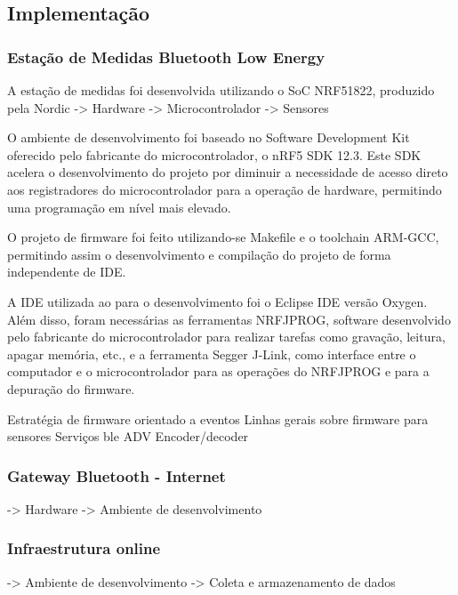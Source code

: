 \subsection{Implementação}

\subsubsection{Estação de Medidas Bluetooth Low Energy}

A estação de medidas foi desenvolvida utilizando o SoC NRF51822, produzido pela Nordic
-> Hardware
-> Microcontrolador
-> Sensores		

O ambiente de desenvolvimento foi baseado no Software Development Kit oferecido
pelo fabricante do microcontrolador, o nRF5 SDK 12.3. Este SDK acelera o
desenvolvimento do projeto por diminuir a necessidade de acesso direto aos
registradores do microcontrolador para a operação de hardware, permitindo uma
programação em nível mais elevado.
 
O projeto de firmware foi feito utilizando-se Makefile e o toolchain ARM-GCC,
permitindo assim o desenvolvimento e compilação do projeto de forma
independente de IDE.

A IDE utilizada ao para o desenvolvimento foi o Eclipse IDE versão Oxygen. Além
disso, foram necessárias as ferramentas NRFJPROG, software desenvolvido pelo
fabricante do microcontrolador para realizar tarefas como gravação, leitura,
apagar memória, etc., e a ferramenta Segger J-Link, como interface entre o
computador e o microcontrolador para as operações do NRFJPROG e para a
depuração do firmware.
 

Estratégia de firmware orientado a eventos
Linhas gerais sobre firmware para sensores
Serviços ble
ADV Encoder/decoder


\subsubsection{Gateway Bluetooth - Internet}
			-> Hardware
			-> Ambiente de desenvolvimento

\subsubsection{Infraestrutura online}
-> Ambiente de desenvolvimento	
-> Coleta e armazenamento de dados
